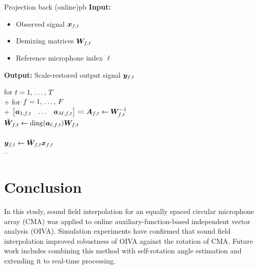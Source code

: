 \documentclass[sip,biber]{now-journal}
\begin{document}
\begin{algorithm}{Projection back (online)}{pb}
  \textbf{Input:}
    \begin{itemize}
      \item Observed signal $\Obs _{\ft}$
      \item Demixing matrices $\Demix _{\ft}$
      \item Reference microphone index $\ell$
    \end{itemize}
  \textbf{Output:} Scale-restored output signal $\Est _{\ft}$
  \begin{pseudo}
    for $t = 1,\, \dots,\, T$ \\+
      for $f = 1,\, \dots,\, F$ \\+
        $\begin{bmatrix} \steer _{1,\ft} & \dots & \steer _{\Mic,\ft} \end{bmatrix} \eqqcolon \Steer _{\ft} \gets \Demix _{\ft} ^{-1}$ \\
        $\tilde{\Demix} _{\ft} \gets \mathrm{diag}(\steer _{\ell,\ft}) \Demix _{\ft}$ \\
         \\
        $\Est _{\ft} \gets \tilde{\Demix} _{\ft} \Obs _{\ft}$ \\--
  \end{pseudo}
\end{algorithm}

\section{Conclusion}
In this study, sound field interpolation for an equally spaced circular microphone array (CMA) was applied to online auxiliary-function-based independent vector analysis (OIVA).
Simulation experiments have confirmed that sound field interpolation improved robustness of OIVA against the rotation of CMA.
Future work includes combining this method with self-rotation angle estimation \cite{Lian:2021:APSIPA} and extending it to real-time processing.
\end{document}
